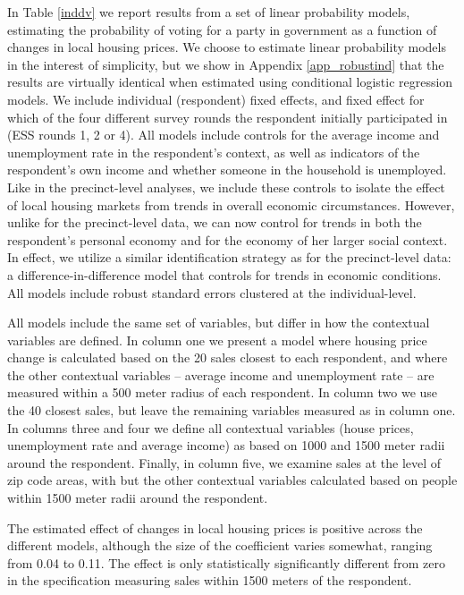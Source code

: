 \documentclass[12pt,a4paper]{article}
\begin{document}
	In Table \ref{inddv} we report results from a set of linear probability models, estimating the probability of voting for a party in government as a function of changes in local housing prices. We choose to estimate linear probability models in the interest of simplicity, but we show in Appendix \ref{app_robustind} that the results are virtually identical when estimated using conditional logistic regression models. We include individual (respondent) fixed effects, and fixed effect for which of the four different survey rounds the respondent initially participated in (ESS rounds 1, 2 or 4). All models include controls for the average income and unemployment rate in the respondent's context, as well as indicators of the respondent's own income and whether someone in the household is unemployed. Like in the precinct-level analyses, we include these controls to isolate the effect of local housing markets from trends in overall economic circumstances. However, unlike for the precinct-level data, we can now control for trends in both the respondent’s personal economy and for the economy of her larger social context. In effect, we utilize a similar identification strategy as for the precinct-level data: a difference-in-difference model that controls for trends in economic conditions. All models include robust standard errors clustered at the individual-level.
	
	All models include the same set of variables, but differ in how the contextual variables are defined. In column one we present a model where housing price change is calculated based on the 20 sales closest to each respondent, and where the other contextual variables -- average income and unemployment rate -- are measured within a 500 meter radius of each respondent. In column two we use the 40 closest sales, but leave the remaining variables measured as in column one. In columns three and four we define all contextual variables (house prices, unemployment rate and average income) as based on 1000 and 1500 meter radii around the respondent. Finally, in column five, we examine sales at the level of zip code areas, with but the other contextual variables calculated based on people within 1500 meter radii around the respondent. 
	
	
	
	The estimated effect of changes in local housing prices is positive across the different models, although the size of the coefficient varies somewhat, ranging from 0.04 to 0.11. The effect is only statistically significantly different from zero in the specification measuring sales within 1500 meters of the respondent.
	
\end{document}
